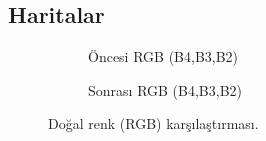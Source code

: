 \documentclass[11pt,a4paper]{article}
\begin{document}
\subsection{Haritalar}
\begin{figure}[H]
  \centering
  \begin{subfigure}[b]{0.48\textwidth}
    \centering
    \caption{Öncesi RGB (B4,B3,B2)}
  \end{subfigure}\hfill
  \begin{subfigure}[b]{0.48\textwidth}
    \centering
    \caption{Sonrası RGB (B4,B3,B2)}
  \end{subfigure}
  \caption{Doğal renk (RGB) karşılaştırması.}
  \label{fig:rgb}
\end{figure}
\FloatBarrier
\end{document}
